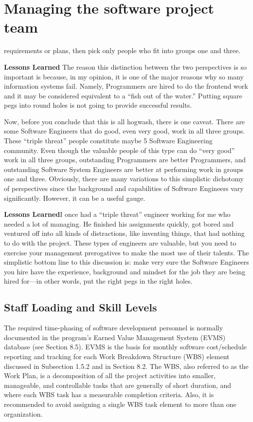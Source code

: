 \documentclass{book}
\begin{document}
\setcounter{chapter}{6}
\chapter{Managing the software project team}
requirements or plans, then pick only people who fit into
groups one and three.

\textbf{Lessons Learned} The reason this distinction
between the two perspectives is so important is
because, in my opinion, it is one of the major
reasons why so many information systems fail.
Namely, Programmers are hired to do the frontend
work and it may be considered equivalent to
a “fish out of the water.” Putting square pegs into
round holes is not going to provide successful
results.

Now, before you conclude that this is all hogwash, there
is one caveat. There are some Software Engineers that do
good, even very good, work in all three groups. These “triple
threat” people constitute maybe 5%
Software Engineering community. Even though the valuable
people of this type can do “very good” work in all three
groups, outstanding Programmers are better Programmers,
and outstanding Software System Engineers are better at performing
work in groups one and three. Obviously, there are
many variations to this simplistic dichotomy of perspectives
since the background and capabilities of Software Engineers
vary significantly. However, it can be a useful gauge.

\textbf{Lessons Learned}I once had a “triple threat”
engineer working for me who needed a lot of
managing. He finished his assignments quickly,
got bored and ventured off into all kinds of
distractions, like inventing things, that had
nothing to do with the project. These types of
engineers are valuable, but you need to exercise
your management prerogatives to make the most
use of their talents. The simplistic bottom line
to this discussion is: make very sure the Software
Engineers you hire have the experience, background
and mindset for the job they are being hired for—in
other words, put the right pegs in the right holes.
\setcounter{section}{1}
\section{Staff Loading and Skill Levels}

The required time-phasing of software development personnel
is normally documented in the program’s Earned
Value Management System (EVMS) database (see Section
8.5). EVMS is the basis for monthly software cost/schedule
reporting and tracking for each Work Breakdown Structure
(WBS) element discussed in Subsection 1.5.2 and in Section
8.2. The WBS, also referred to as the Work Plan, is a decomposition
of all the project activities into smaller, manageable,
and controllable tasks that are generally of short duration,
and where each WBS task has a measurable completion criteria.
Also, it is recommended to avoid assigning a single WBS
task element to more than one organization.
\end{document}
